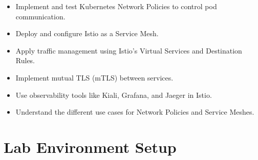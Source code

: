 \documentclass{article}
\begin{document}
\begin{itemize}
    \item Implement and test Kubernetes Network Policies to control pod communication.
    \item Deploy and configure Istio as a Service Mesh.
    \item Apply traffic management using Istio's Virtual Services and Destination Rules.
    \item Implement mutual TLS (mTLS) between services.
    \item Use observability tools like Kiali, Grafana, and Jaeger in Istio.
    \item Understand the different use cases for Network Policies and Service Meshes.
\end{itemize}

\newpage

\section{Lab Environment Setup}
\end{document}
